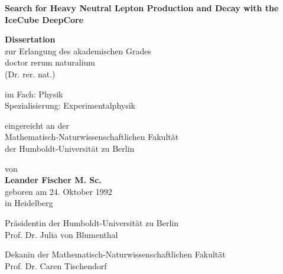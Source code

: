 \thispagestyle{plain}
\begin{center}
	\vspace*{1cm}

	\LARGE
	\textbf{Search for Heavy Neutral Lepton Production and Decay with the IceCube DeepCore}
	\large

	\vspace{0.8cm}

	\textbf{Dissertation}\\
	zur Erlangung des akademischen Grades\\
	doctor rerum naturalium \\
	(Dr. rer. nat.) \\

	\vspace{0.5cm}

	im Fach: Physik \\
	Spezialisierung: Experimentalphysik\\

	\vspace{0.5cm}

	eingereicht an der \\
	Mathematisch-Naturwissenschaftlichen Fakultät\\
	der Humboldt-Universität zu Berlin\\

	\vspace{0.5cm}

	von\\
	\textbf{Leander Fischer M. Sc.}\\
	geboren am 24. Oktober 1992\\
	in Heidelberg

	\vspace{0.5cm}

	Präsidentin der Humboldt-Universität zu Berlin\\
	Prof. Dr. Julia von Blumenthal\\

	\vspace{0.5cm}

	Dekanin der Mathematisch-Naturwissenschaftlichen Fakultät\\
	Prof. Dr. Caren Tischendorf\\
\end{center}

\newpage
\thispagestyle{plain}

